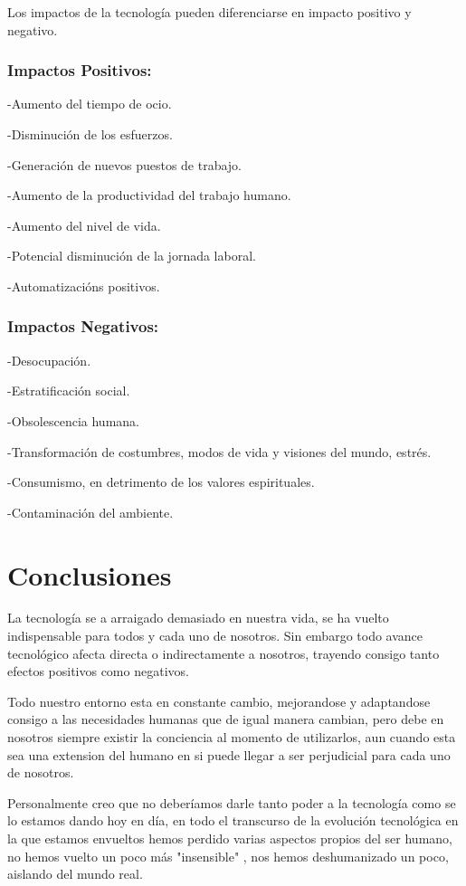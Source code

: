 \documentclass{bmcart}
\begin{document}
 Los impactos de la tecnología pueden diferenciarse en impacto positivo y negativo.\smallskip
 
 \subsubsection*{Impactos Positivos: }
 \smallskip
 -Aumento del tiempo de ocio.\smallskip
 
 -Disminución de los esfuerzos.\smallskip
 
 -Generación de nuevos puestos de trabajo.\smallskip
 
 -Aumento de la productividad del trabajo humano.\smallskip
 
 -Aumento del nivel de vida.\smallskip
 
 -Potencial disminución de la jornada laboral.\smallskip 
 
 -Automatizacións positivos.\smallskip
 
 \subsubsection*{Impactos Negativos: }
 \smallskip
 -Desocupación.\smallskip
 
 -Estratificación social.\smallskip
 
 -Obsolescencia humana.\smallskip
 
 -Transformación de costumbres, modos de vida y visiones del mundo, estrés.\smallskip
 
 -Consumismo, en detrimento de los valores espirituales.\smallskip
 
 -Contaminación del ambiente.\smallskip
\section*{Conclusiones}
La tecnología se a arraigado demasiado en nuestra vida, se ha vuelto indispensable para todos y cada uno de nosotros. Sin embargo todo avance tecnológico afecta directa o indirectamente a nosotros, trayendo consigo tanto efectos positivos como negativos.\smallskip

Todo nuestro entorno esta en constante cambio, mejorandose y adaptandose consigo a las necesidades humanas que de igual manera cambian, pero debe en nosotros siempre existir la conciencia al momento de utilizarlos, aun cuando esta sea una extension del humano en si puede llegar a ser perjudicial para cada uno de nosotros.\smallskip

Personalmente creo que no deberíamos darle tanto poder a la tecnología como se lo estamos dando hoy en día, en todo el transcurso de la evolución tecnológica en la que estamos envueltos hemos perdido varias aspectos propios del ser humano, no hemos vuelto un poco más "insensible" , nos hemos deshumanizado un poco, aislando del mundo real. 
\end{document}
